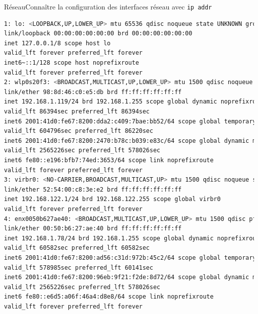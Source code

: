 \documentclass{beamer}
\begin{document}
    \begin{frame}[fragile]{Réseau}{Connaître la configuration des interfaces réseau avec \lstinline{ip addr}}
        \begin{lstlisting}[language=bash,basicstyle=\tiny\ttfamily]
1: lo: <LOOPBACK,UP,LOWER_UP> mtu 65536 qdisc noqueue state UNKNOWN group default qlen 1000
link/loopback 00:00:00:00:00:00 brd 00:00:00:00:00:00
inet 127.0.0.1/8 scope host lo
valid_lft forever preferred_lft forever
inet6~::1/128 scope host noprefixroute
valid_lft forever preferred_lft forever
2: wlp0s20f3: <BROADCAST,MULTICAST,UP,LOWER_UP> mtu 1500 qdisc noqueue state UP group default qlen 1000
link/ether 98:8d:46:c0:e5:db brd ff:ff:ff:ff:ff:ff
inet 192.168.1.119/24 brd 192.168.1.255 scope global dynamic noprefixroute wlp0s20f3
valid_lft 86394sec preferred_lft 86394sec
inet6 2001:41d0:fe67:8200:dda2:c409:7bae:bb52/64 scope global temporary dynamic
valid_lft 604796sec preferred_lft 86220sec
inet6 2001:41d0:fe67:8200:2470:b78c:b039:e83c/64 scope global dynamic mngtmpaddr noprefixroute
valid_lft 2565226sec preferred_lft 578026sec
inet6 fe80::e196:bfb7:74ed:3653/64 scope link noprefixroute
valid_lft forever preferred_lft forever
3: virbr0: <NO-CARRIER,BROADCAST,MULTICAST,UP> mtu 1500 qdisc noqueue state DOWN group default qlen 1000
link/ether 52:54:00:c8:3e:e2 brd ff:ff:ff:ff:ff:ff
inet 192.168.122.1/24 brd 192.168.122.255 scope global virbr0
valid_lft forever preferred_lft forever
4: enx0050b627ae40: <BROADCAST,MULTICAST,UP,LOWER_UP> mtu 1500 qdisc pfifo_fast state UP group default qlen 1000
link/ether 00:50:b6:27:ae:40 brd ff:ff:ff:ff:ff:ff
inet 192.168.1.78/24 brd 192.168.1.255 scope global dynamic noprefixroute enx0050b627ae40
valid_lft 60582sec preferred_lft 60582sec
inet6 2001:41d0:fe67:8200:ad56:c31d:972b:45c2/64 scope global temporary dynamic
valid_lft 578985sec preferred_lft 60141sec
inet6 2001:41d0:fe67:8200:96eb:9f21:f2de:8d72/64 scope global dynamic mngtmpaddr noprefixroute
valid_lft 2565226sec preferred_lft 578026sec
inet6 fe80::e6d5:a06f:46a4:d8e8/64 scope link noprefixroute
valid_lft forever preferred_lft forever
        \end{lstlisting}
    \end{frame}
\end{document}
